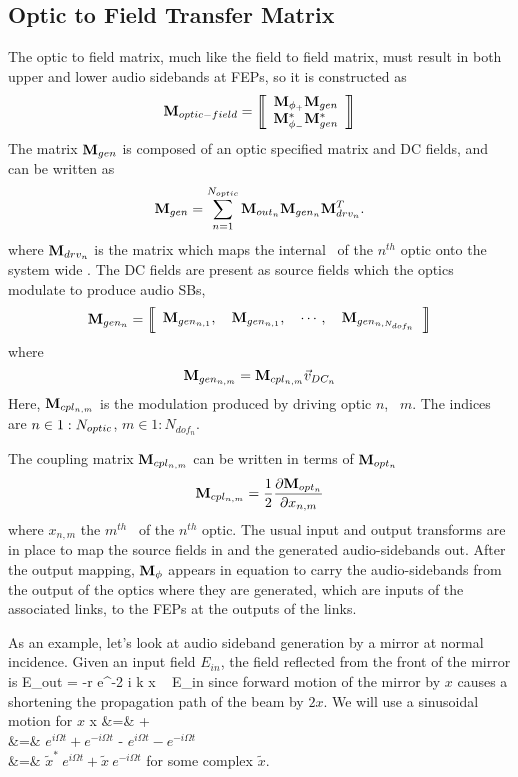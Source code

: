 \documentclass[12pt]{article}
\begin{document}
\subsection{Optic to Field Transfer Matrix}
The optic to field matrix, much like the field to field matrix, must result in both upper and lower audio sidebands at FEPs, so it is constructed as
\begin{equation}
\matm{optic-field} =
\matrixBegin{c}
 \mPhin{+} \mGen \\
 \mPhin{-}^* \mGen^* \\
\matrixEnd
\elabel{mOF}
\end{equation}
The matrix $\mathbf{M}_{gen}$ is composed of an optic specified matrix and DC fields, and can be written as
\begin{equation}
\mathbf{M}_{gen} = \sum_{n=1}^{N_{optic}} {\mathbf{M}_{out_{n}} \mathbf{M}_{gen_{n}} \mathbf{M}_{drv_{n}}^{T}}.
\end{equation}
where $\mathbf{M}_{drv_{n}}$ is the matrix which maps the internal \dsf\ of the $n^{th}$ optic onto the system wide \dsf. The DC fields are present as source fields which the optics modulate to produce audio SBs,
\begin{equation}
\mGenn{n} = \matrixBegin{c}
\mGenn{n,1} , ~~~
\mGenn{n,1} , ~~~
\cdots , ~~~
\mGenn{n,N_{dof_n}}
\matrixEnd \elabel{mGen}
\end{equation}
where
\begin{equation}
\mathbf{M}_{gen_{n,m}} = \mathbf{M}_{cpl_{n,m}} \vec{v}_{DC_{n}}
\end{equation}
Here, $\mathbf{M}_{cpl_{n,m}}$ is the modulation produced by driving optic $n$, \dof\ $m$.
The indices are $n \in 1:N_{optic}$, $m \in 1:N_{dof_n}$.

The coupling matrix $\mathbf{M}_{cpl_{n,m}}$ can be written in terms of $\mathbf{M}_{opt_{n}}$
\begin{equation}
\mCpln{n,m} = \frac{1}{2} \partderiv{\mOptn{n}}{x_{n,m}}
\elabel{mDrv}
\end{equation}
where $x_{n,m}$ the $m^{th}$ \dof\ of the $n^{th}$ optic. The usual input and output transforms are in place to map the source fields in and the generated audio-sidebands out.
After the output mapping, $\mathbf{M}_{\phi}$ appears in equation  to carry the audio-sidebands from the output of the optics where they are generated, which are inputs of the associated links, to the FEPs at the outputs of the links.

As an example, let's look at audio sideband generation by a mirror at normal incidence.
Given an input field $E_{in}$, the field reflected from the front of the mirror is
E_{out} = -r e^{-2 i k x} ~ E_{in}
\eeq
 since forward motion of the mirror by $x$ causes a shortening the propagation path of the beam by $2 x$.
We will use a sinusoidal motion for $x$
x &=&   +   \\
  &=& \half {} \(e^{i \Omega t} + e^{-i \Omega t} \) -   \(e^{i \Omega t} - e^{-i \Omega t} \) \\
  &=& \half \( \tilde{x}^* ~ e^{i \Omega t} + \tilde{x} ~ e^{-i \Omega t} \)
\eeqa
 for some complex $\tilde{x}$.
\end{document}
